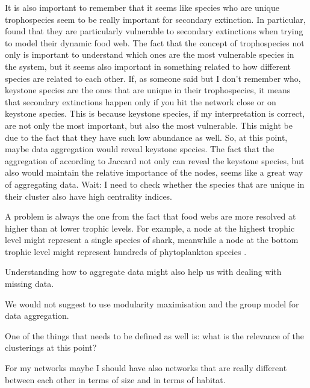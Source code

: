 \documentclass[twocolumn]{article}
\begin{document}
    \par It is also important to remember that it seems like species who are unique trophospecies seem to be really important for secondary extinction. In particular, \citep{Petchey2008a} found that they are particularly vulnerable to secondary extinctions when trying to model their dynamic food web. The fact that the concept of trophospecies not only is important to understand which ones are the most vulnerable species in the system, but it seems also important in something related to how different species are related to each other. If, as someone said but I don't remember who, keystone species are the ones that are unique in their trophospecies, it means that secondary extinctions happen only if you hit the network close or on keystone species. This is because keystone species, if my interpretation is correct, are not only the most important, but also the most vulnerable. This might be due to the fact that they have such low abundance as well. %
    So, at this point, maybe data aggregation would reveal keystone species. The fact that the aggregation of according to Jaccard not only can reveal the keystone species, but also would maintain the relative importance of the nodes, seems like a great way of aggregating data. Wait: I need to check whether the species that are unique in their cluster also have high centrality indices.  
    \par A problem is always the one from the fact that food webs are more resolved at higher than at lower trophic levels. For example, a node at the highest trophic level might represent a single species of shark, meanwhile a node at the bottom trophic level might represent hundreds of phytoplankton species \citep{}.
    \par Understanding how to aggregate data might also help us with dealing with missing data. 
    \par We would not suggest to use modularity maximisation and the group model for data aggregation.
    \par One of the things that needs to be defined as well is: what is the relevance of the clusterings at this point? 
    \par For my networks maybe I should have also networks that are really different between each other in terms of size and in terms of habitat. 
    
\end{document}
